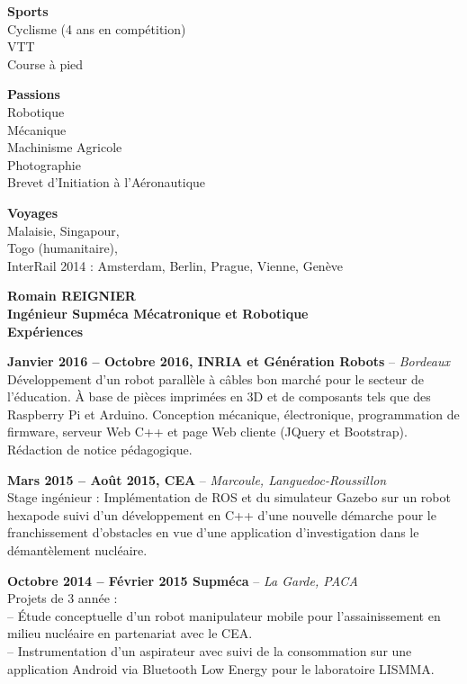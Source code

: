 \documentclass[a4paper,11pt,final]{memoir}
\newcommand{\SmallSep}{\vspace{0.5em}}
\newenvironment{AboutMe}
	{\ignorespaces}%
	{\SmallSep\ignorespacesafterend}
\newcommand{\CVSection}[1]
	{\Large\textbf{#1}\par
	\SmallSep\normalsize\normalfont}
\newcommand{\CVItem}[2]
	{\textbf{\color{RoyalBlue} #1 \color{dark_gray} #2}\normalsize\normalfont}
\newcommand{\city}[1]
	{{\small\color{dark_gray}\emph{#1}}\normalsize\normalfont}
\newcommand{\SkillSection}[1]
	{\normalsize{\textbf{#1\\}}\normalfont\small}%
\begin{document}
\begin{flushleft}
\SkillSection{Sports}
Cyclisme (4 ans en compétition)\\
VTT\\
Course à pied\\
\SmallSep

\SkillSection{Passions}
Robotique\\
Mécanique\\
Machinisme Agricole\\
Photographie\\
Brevet d'Initiation à l'Aéronautique
\SmallSep

\SkillSection{Voyages}
Malaisie, Singapour,\\Togo (humanitaire),\\
InterRail 2014 : Amsterdam, Berlin, Prague, Vienne, Genève
\end{flushleft}
\framebreak

\Huge\bfseries {\color{RoyalBlue} Romain REIGNIER} \\
\Large\bfseries  Ingénieur Supméca Mécatronique et Robotique\\


\CVSection{Expériences}
\CVItem{Janvier 2016 -- Octobre 2016,}{INRIA et Génération Robots} -- \city{Bordeaux}\\
Développement d'un robot parallèle à câbles bon marché pour le secteur de l'éducation. À base de pièces imprimées en 3D et de composants tels que des Raspberry Pi et Arduino. Conception mécanique, électronique, programmation de firmware, serveur Web C++ et page Web cliente (JQuery et Bootstrap). Rédaction de notice pédagogique.
\SmallSep

\CVItem{Mars 2015 -- Août 2015,}{CEA} -- \city{Marcoule, Languedoc-Roussillon}\\
Stage ingénieur : Implémentation de ROS et du simulateur Gazebo sur un robot hexapode suivi d'un développement en C++ d'une nouvelle démarche pour le franchissement d'obstacles en vue d'une application d'investigation dans le démantèlement nucléaire.
\SmallSep

\CVItem{Octobre 2014 -- Février 2015}{Supméca} -- \city{La Garde, PACA}\\
Projets de 3\ieme{} année :\\
-- Étude conceptuelle d'un robot manipulateur mobile pour l'assainissement en milieu nucléaire en partenariat avec le CEA.\\
-- Instrumentation d'un aspirateur avec suivi de la consommation sur une application Android via Bluetooth Low Energy pour le laboratoire LISMMA.
\SmallSep
\end{document}

